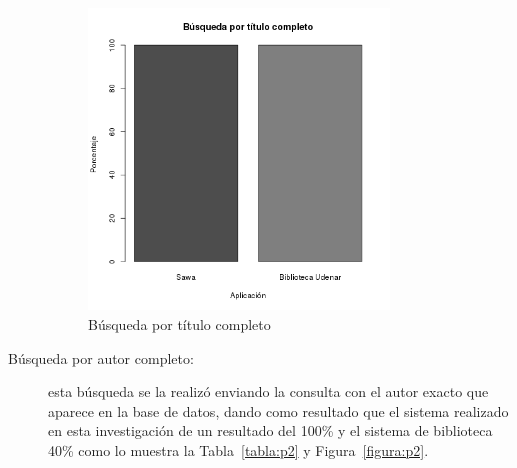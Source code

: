 \begin{description}
 \begin{figure}[!ht]
\begin{center}
\includegraphics[width=8cm]{pictures/p1.png}
\end{center}
\caption{Búsqueda por título completo} \label{figura:p1}
\end{figure}

\newpage
  
 \item [Búsqueda por autor completo:] esta búsqueda se la realizó enviando la consulta con
 el autor exacto que aparece en la base de datos, dando como resultado que el sistema realizado
 en esta investigación de un resultado del 100\% y el sistema de biblioteca 40\% como lo muestra la Tabla~\ref{tabla:p2} y Figura~\ref{figura:p2}.
 
  \begin{center}
\begin{table}[!ht]
\caption{Búsqueda por autor completo} \label{tabla:p2}
\end{table}
\end{center}
 

\end{description}
